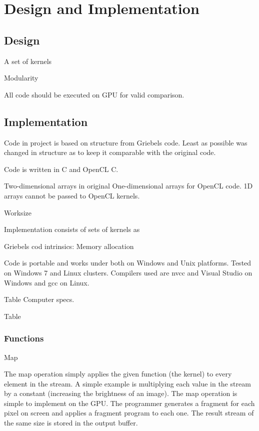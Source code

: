 \chapter{Design and Implementation}

\section{Design}

A set of kernels

Modularity

All code should be executed on GPU for valid comparison. 

\section{Implementation}
Code in project is based on structure from Griebels code\cite{griebel1998numerical}. Least as possible was changed in structure as to keep it comparable with the original code.

Code is written in C and OpenCL C.

Two-dimensional arrays in original 
One-dimensional arrays for OpenCL code. 1D arrays cannot be passed to OpenCL kernels.

Worksize

Implementation consists of sets of kernels as 

Griebels cod intrinsics: Memory allocation

Code is portable and works under both on Windows and Unix platforms. Tested on Windows 7 and Linux clusters. Compilers used are nvcc and Visual Studio on Windows and gcc on Linux.

Table Computer specs.


Table

\subsection{Functions}
Map

The map operation simply applies the given function (the kernel) to every element in the stream. A simple example is multiplying each value in the stream by a constant (increasing the brightness of an image). The map operation is simple to implement on the GPU. The programmer generates a fragment for each pixel on screen and applies a fragment program to each one. The result stream of the same size is stored in the output buffer.


